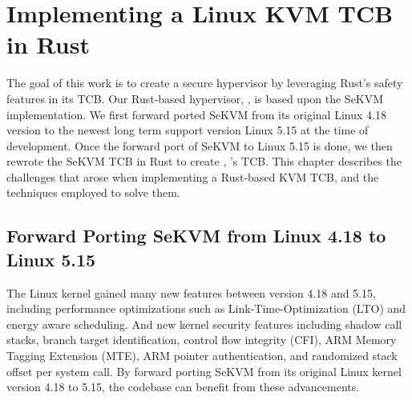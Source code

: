 \chapter{Implementing a Linux KVM TCB in Rust}
\label{sec:rewrite}



The goal of this work is to create a secure hypervisor by leveraging Rust's
safety features in its TCB.
Our Rust-based hypervisor, \rustsec{}, is based upon the SeKVM implementation.
We first forward ported SeKVM from its original Linux 4.18 version to the
newest long term support version Linux 5.15 at the time of development.
Once the forward port of SeKVM to Linux 5.15 is done, we then rewrote the SeKVM
TCB \secore{} in Rust to create \rustcore{}, \rustsec{}'s TCB. This chapter
describes the challenges that arose when implementing a Rust-based KVM TCB, and
the techniques employed to solve them.

\section{Forward Porting SeKVM from Linux 4.18 to Linux 5.15}
The Linux kernel gained many new features between version 4.18 and 5.15,
including performance optimizations such as Link-Time-Optimization (LTO) and
energy aware scheduling. And new kernel security features including
 shadow call stacks, branch target identification, control flow
integrity (CFI), ARM Memory Tagging Extension (MTE), ARM pointer
authentication, and randomized stack offset per system call.
By forward porting SeKVM from its original Linux kernel version 4.18 to 5.15,
the codebase can benefit from these advancements.


